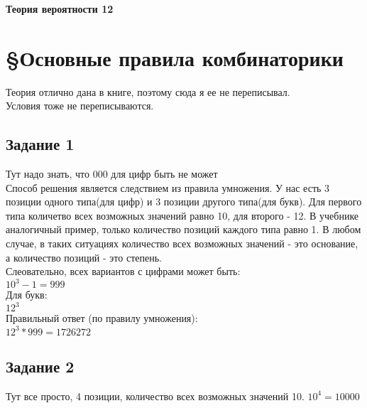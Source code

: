 \documentclass[12pt]{article}
\begin{document}
\begin{titlepage}
\begin{center}
\textbf{\huge Теория вероятности 12}
\end{center}
\end{titlepage}
\tableofcontents
\newpage
\section{\S Основные правила комбинаторики}

Теория отлично дана в книге, поэтому сюда я ее не переписывал.\\
Условия тоже не переписываются.

\newpage
\subsection{Задание 1}

Тут надо знать, что 000 для цифр быть не может\\
Способ решения является следствием из правила умножения. У нас есть 3 позиции одного типа(для цифр) и 3 позиции другого типа(для букв). Для первого типа количетво всех возможных значений равно 10, для второго - 12. В учебнике аналогичный пример, только количество позиций каждого типа равно 1. В любом случае, в таких ситуациях  количество всех возможных значений - это основание, а количество позиций - это степень.\\
Слеовательно, всех  вариантов с цифрами может быть:\\
$10^{3}-1=999$
\\
Для букв:\\
$12^{3}$
\\
Правильный ответ (по правилу умножения):\\
$12^{3}*999=1726272$

\newpage
\subsection{Задание 2}
Тут все просто, 4 позиции,  количество всех возможных значений 10.
$10^{4}=10000$

\newpage
\end{document}
